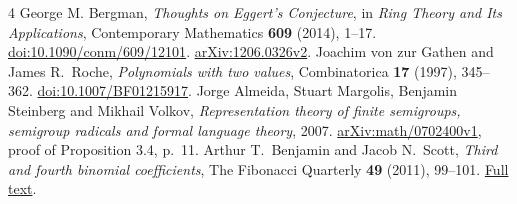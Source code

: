 \documentclass[11pt]{article}
\begin{document}
\begin{thebibliography}{4}
George M. Bergman,
\emph{Thoughts on Eggert's Conjecture},
in \emph{Ring Theory and Its Applications},
Contemporary Mathematics \textbf{609} (2014), 1--17.
\href{https://doi.org/10.1090/conm/609/12101}{doi:10.1090/conm/609/12101}.
\href{https://arxiv.org/abs/1206.0326v2}{arXiv:1206.0326v2}.
Joachim von zur Gathen and James R.\ Roche,
\emph{Polynomials with two values},
Combinatorica \textbf{17} (1997), 345--362.
\href{https://doi.org/10.1007/BF01215917}{doi:10.1007/BF01215917}.
Jorge Almeida, Stuart Margolis, Benjamin Steinberg and Mikhail Volkov,
\emph{Representation theory of finite semigroups, semigroup radicals and
formal language theory}, 2007.
\href{https://arxiv.org/abs/math/0702400v1}{arXiv:math/0702400v1},
proof of Proposition 3.4, p.\ 11.
Arthur T.\ Benjamin and Jacob N.\ Scott,
\emph{Third and fourth binomial coefficients},
The Fibonacci Quarterly \textbf{49} (2011), 99--101.
\href{https://www.fq.math.ca/Papers1/49-2/BenjaminScott.pdf}{Full text}.
\end{thebibliography}

\medskip
{}
\end{document}
